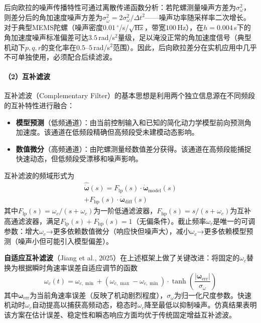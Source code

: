 后向欧拉的噪声传播特性可通过离散传递函数分析：若陀螺测量噪声方差为$\sigma_\omega^2$，则差分后的角加速度噪声方差为$\sigma_{\dot{\omega}}^2 = 2\sigma_\omega^2/\Delta t^2$——噪声功率随采样率二次增长。对于典型MEMS陀螺（噪声密度$0.01$\,$^\circ$/s/$\sqrt{\text{Hz}}$，带宽$100$\,Hz），在$h=0.004$\,s下的角加速度噪声标准偏差可达$3.5$\,rad/s$^2$量级，足以淹没正常的角加速度信号（典型机动下$p,q,r$的变化率在$0.5$--$5$\,rad/s$^2$范围）。因此，后向欧拉差分在实机应用中几乎不可单独使用，必须配合后续滤波。

\paragraph{（2）互补滤波}

互补滤波（Complementary Filter）的基本思想是利用两个独立信息源在不同频段的互补特性进行融合\cite{jiang2025adaptive}：
\begin{itemize}
    \item \textbf{模型预测}（低频通道）：由当前控制输入和已知的简化动力学模型前向预测角加速度。该通道在低频段精确但高频段受未建模动态影响。
    \item \textbf{数值微分}（高频通道）：由陀螺测量经数值差分获得。该通道在高频段能捕捉快速动态，但低频段受漂移和噪声影响。
\end{itemize}

互补滤波的频域形式为
\begin{multline}
    \hat{\dot{\boldsymbol{\omega}}}(s) = F_{\mathrm{lp}}(s) \cdot \dot{\boldsymbol{\omega}}_{\text{model}}(s) \\
    + F_{\mathrm{hp}}(s) \cdot \dot{\boldsymbol{\omega}}_{\text{diff}}(s)
    \label{eq:comp_filter_freq}
\end{multline}
其中$F_{\mathrm{lp}}(s) = \omega_c/(s+\omega_c)$为一阶低通滤波器，$F_{\mathrm{hp}}(s) = s/(s+\omega_c)$为互补高通滤波器，满足$F_{\mathrm{lp}}(s) + F_{\mathrm{hp}}(s) = 1$（无偏条件）。截止频率$\omega_c$是唯一的可调参数：增大$\omega_c$→更多依赖数值微分（响应快但噪声大），减小$\omega_c$→更多依赖模型预测（噪声小但可能引入模型偏差）。

\textbf{自适应互补滤波}（Jiang et al., 2025）\cite{jiang2025adaptive}在上述框架上做了关键改进：将固定的$\omega_c$替换为根据瞬时角速率误差自适应调节的函数
\begin{equation}
    \omega_c(t) = \omega_{c,\min} + (\omega_{c,\max} - \omega_{c,\min}) \cdot \tanh\left(\frac{|\boldsymbol{\omega}_{\text{err}}|}{\sigma_\omega}\right)
    \label{eq:adaptive_cf}
\end{equation}
其中$\boldsymbol{\omega}_{\text{err}}$为当前角速率误差（反映了机动剧烈程度），$\sigma_\omega$为归一化尺度参数。快速机动时$\omega_c$自动提高以捕获高频动态，稳态时$\omega_c$降至最低以抑制噪声。仿真结果表明该方案在估计误差、稳定性和瞬态响应方面均优于传统固定增益互补滤波\cite{jiang2025adaptive}。

